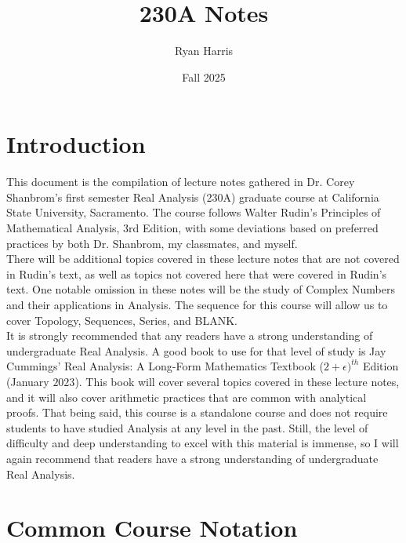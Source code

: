 \documentclass{article}
\title{230A Notes}
\author{Ryan Harris}
\date{Fall 2025}
\begin{document}
\maketitle

\tableofcontents


\newpage


\section{Introduction}

This document is the compilation of lecture notes gathered in Dr. Corey Shanbrom's first semester Real Analysis (230A) graduate course at California State University, Sacramento. The course follows Walter Rudin's Principles of Mathematical Analysis, 3rd Edition, with some deviations based on preferred practices by both Dr. Shanbrom, my classmates, and myself. \\

There will be additional topics covered in these lecture notes that are not covered in Rudin's text, as well as topics not covered here that were covered in Rudin's text. One notable omission in these notes will be the study of Complex Numbers and their applications in Analysis. The sequence for this course will allow us to cover Topology, Sequences, Series, and BLANK. \\

It is strongly recommended that any readers have a strong understanding of undergraduate Real Analysis. A good book to use for that level of study is Jay Cummings' Real Analysis: A Long-Form Mathematics Textbook ($2+\epsilon)^{th}$ Edition (January $2023$). This book will cover several topics covered in these lecture notes, and it will also cover arithmetic practices that are common with analytical proofs. That being said, this course is a standalone course and does not require students to have studied Analysis at any level in the past. Still, the level of difficulty and deep understanding to excel with this material is immense, so I will again recommend that readers have a strong understanding of undergraduate Real Analysis.


\newpage


\section*{Common Course Notation}


\newpage
\end{document}
